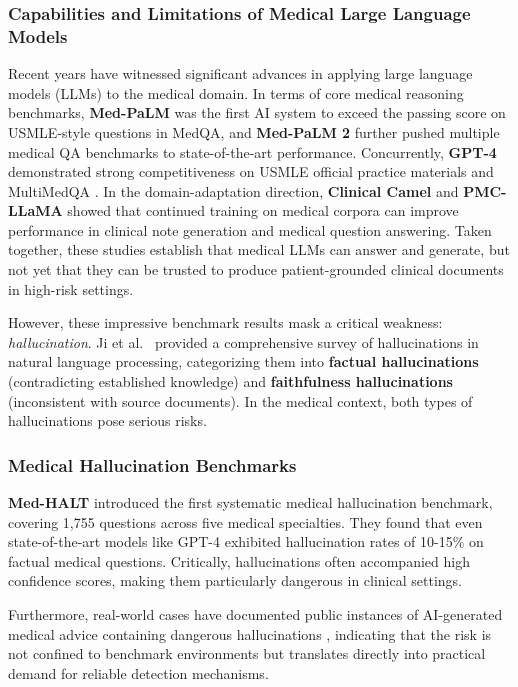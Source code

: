 \documentclass[11pt]{article}
\begin{document}
\subsubsection{Capabilities and Limitations of Medical Large Language Models}

Recent years have witnessed significant advances in applying large language models (LLMs) to the medical domain. In terms of core medical reasoning benchmarks, \textbf{Med-PaLM} \citep{singhal2023clinicalKnowledge} was the first AI system to exceed the passing score on USMLE-style questions in MedQA, and \textbf{Med-PaLM 2} \citep{singhal2023expertMedicalQA} further pushed multiple medical QA benchmarks to state-of-the-art performance. Concurrently, \textbf{GPT-4} demonstrated strong competitiveness on USMLE official practice materials and MultiMedQA \citep{nori2023gpt4Medical}. In the domain-adaptation direction, \textbf{Clinical Camel} \citep{toma2023clinicalCamel} and \textbf{PMC-LLaMA} \citep{wu2023pmcLLaMA} showed that continued training on medical corpora can improve performance in clinical note generation and medical question answering. Taken together, these studies establish that medical LLMs can answer and generate, but not yet that they can be trusted to produce patient-grounded clinical documents in high-risk settings.

However, these impressive benchmark results mask a critical weakness: \emph{hallucination}. Ji et al.~\citep{ji2023hallucinationSurvey} provided a comprehensive survey of hallucinations in natural language processing, categorizing them into \textbf{factual hallucinations} (contradicting established knowledge) and \textbf{faithfulness hallucinations} (inconsistent with source documents). In the medical context, both types of hallucinations pose serious risks.

\subsubsection{Medical Hallucination Benchmarks}

\textbf{Med-HALT} \citep{pal2023medHalt} introduced the first systematic medical hallucination benchmark, covering 1,755 questions across five medical specialties. They found that even state-of-the-art models like GPT-4 exhibited hallucination rates of 10-15\% on factual medical questions. Critically, hallucinations often accompanied high confidence scores, making them particularly dangerous in clinical settings.

Furthermore, real-world cases have documented public instances of AI-generated medical advice containing dangerous hallucinations \citep{pal2023medHalt,ji2023hallucinationSurvey}, indicating that the risk is not confined to benchmark environments but translates directly into practical demand for reliable detection mechanisms.
\end{document}
